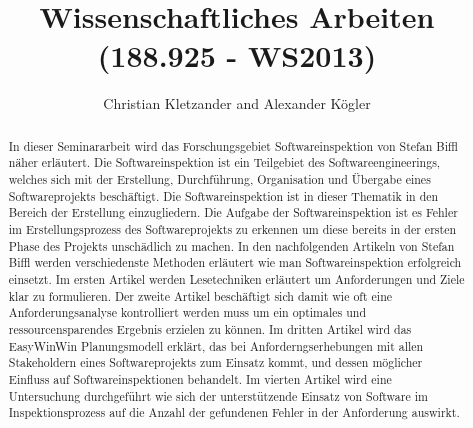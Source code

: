 \documentclass{llncs}
\begin{document}
\pagestyle{plain}

\title{Wissenschaftliches Arbeiten (188.925 - WS2013)}


\author{Christian Kletzander and Alexander Kögler}


\maketitle

\begin{abstract}
In dieser Seminararbeit wird das Forschungsgebiet Softwareinspektion von Stefan Biffl näher erläutert. Die Softwareinspektion ist ein Teilgebiet des Softwareengineerings, welches sich mit der Erstellung, Durchführung, Organisation und Übergabe eines Softwareprojekts beschäftigt. Die Softwareinspektion ist in dieser Thematik in den Bereich der Erstellung einzugliedern. Die Aufgabe der Softwareinspektion ist es Fehler im Erstellungsprozess des Softwareprojekts zu erkennen um diese bereits in der ersten Phase des Projekts unschädlich zu machen. In den nachfolgenden Artikeln von Stefan Biffl werden verschiedenste Methoden erläutert wie man Softwareinspektion erfolgreich einsetzt. Im ersten Artikel werden Lesetechniken erläutert um Anforderungen und Ziele klar zu formulieren. Der zweite Artikel beschäftigt sich damit wie oft eine Anforderungsanalyse kontrolliert werden muss um ein optimales und ressourcensparendes Ergebnis erzielen zu können. Im dritten Artikel wird das EasyWinWin Planungsmodell erklärt, das bei Anforderngserhebungen mit allen Stakeholdern eines Softwareprojekts zum Einsatz kommt, und dessen möglicher Einfluss auf Softwareinspektionen behandelt. Im vierten Artikel wird eine Untersuchung durchgeführt wie sich der unterstützende Einsatz von Software im Inspektionsprozess auf die Anzahl der gefundenen Fehler in der Anforderung auswirkt.
\end{abstract}
\end{document}
